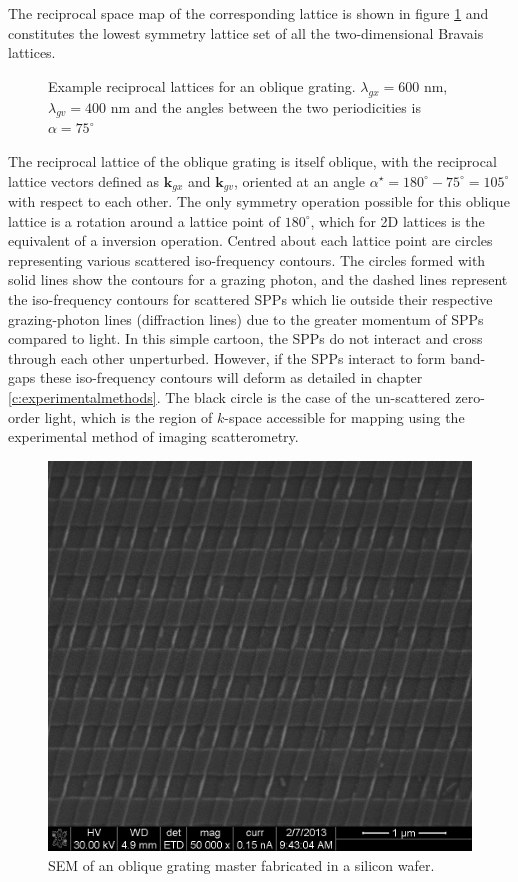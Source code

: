 The reciprocal space map of the corresponding lattice is shown in figure \ref{fig:obl-rcpspace} and constitutes the lowest symmetry lattice set of all the two-dimensional Bravais lattices. 
\begin{figure}
\centering 
\caption[Example reciprocal lattices for an oblique grating.]{Example reciprocal lattices for an oblique grating. $\lambda_{gx}= 600$ nm, $\lambda_{gv}=400$ nm and the angles between the two periodicities is $\alpha = 75^\circ$\label{fig:obl-rcpspace} }
\end{figure} 
The reciprocal lattice of the oblique grating is itself oblique, with the reciprocal lattice vectors defined as $\mathbf{k}_{gx}$ and $\mathbf{k}_{gv}$, oriented at an angle $\alpha^\star = 180^\circ-75^\circ=105^\circ$ with respect to each other. The only symmetry operation possible for this oblique lattice is a rotation around a lattice point of $180^\circ$, which for 2D lattices is the equivalent of a inversion operation. Centred about each lattice point are circles representing various scattered iso-frequency contours. The circles formed with solid lines show the contours for a grazing photon, and the dashed lines represent the iso-frequency contours for scattered SPPs which lie outside their respective grazing-photon lines (diffraction lines) due to the greater momentum of SPPs compared to light. In this simple cartoon, the SPPs do not interact and cross through each other unperturbed. However, if the SPPs interact to form band-gaps these iso-frequency contours will deform as detailed in chapter \ref{c:experimentalmethods}. The black circle is the case of the un-scattered zero-order light, which is the region of $k$-space accessible for mapping using the experimental method of imaging scatterometry.

\begin{figure}
\centering\includegraphics[width=0.4\linewidth]{pic_019}
\caption{SEM of an oblique grating master fabricated in a silicon wafer. \label{fig:obl-sample}}
\end{figure}

